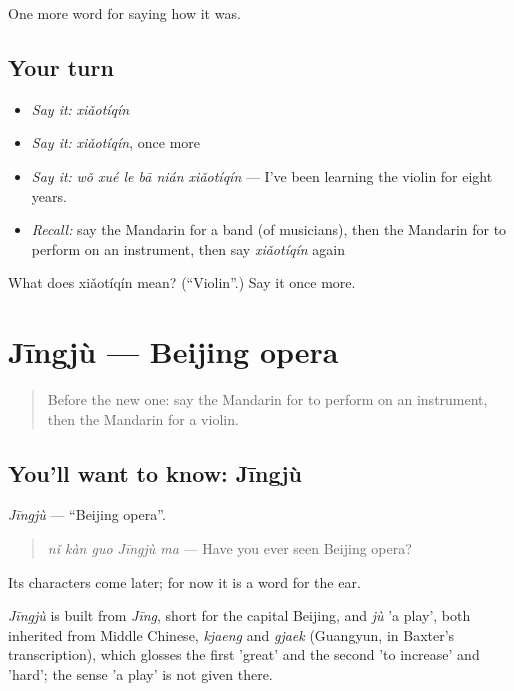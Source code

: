 \begin{grammarlens}[title={What you've built}]
One more word for saying how it was.
\end{grammarlens}

\subsection*{Your turn}
\begin{itemize}
\raggedright
  \item \emph{Say it:} \emph{xiǎotíqín}
  \item \emph{Say it:} \emph{xiǎotíqín}, once more
  \item \emph{Say it:} \emph{wǒ xué le bā nián xiǎotíqín} — I've been learning the violin for eight years.
  \item \emph{Recall:} say the Mandarin for a band (of musicians), then the Mandarin for to perform on an instrument, then say \emph{xiǎotíqín} again
\end{itemize}

\begin{tcolorbox}[breakable,colback=teal!4,colframe=teal!35!black,title={Before you move on}]
What does xiǎotíqín mean? (\textquotedblleft{}Violin\textquotedblright{}.) Say it once more.
\end{tcolorbox}
\section[Jīngjù]{Jīngjù — Beijing opera}

\label{lesson:ZH-C506-jingju}



\begin{quote}
Before the new one: say the Mandarin for to perform on an instrument, then the Mandarin for a violin.
\end{quote}

\subsection*{You'll want to know: Jīngjù}
\emph{Jīngjù} — \textquotedblleft{}Beijing opera\textquotedblright{}.

\begin{quote}
\emph{nǐ kàn guo Jīngjù ma} — Have you ever seen Beijing opera?
\end{quote}

Its characters come later; for now it is a word for the ear.

\begin{cousinweb}
\emph{Jīngjù} is built from \emph{Jīng}, short for the capital Beijing, and \emph{jù} 'a play', both inherited from Middle Chinese, \emph{kjaeng} and \emph{gjaek} (Guangyun, in Baxter's transcription), which glosses the first 'great' and the second 'to increase' and 'hard'; the sense 'a play' is not given there.
\end{cousinweb}

